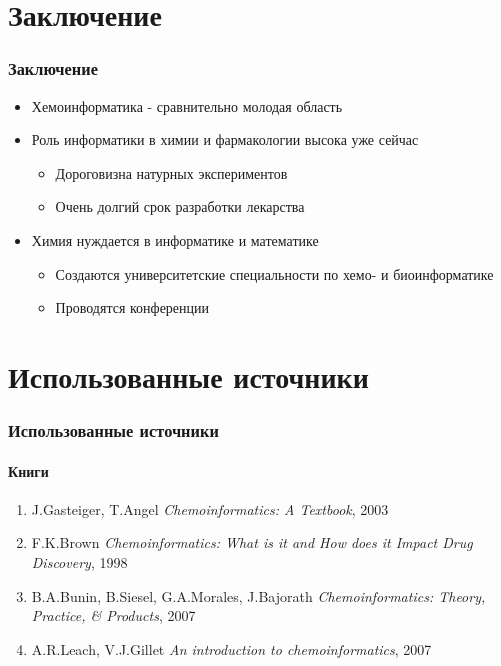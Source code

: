 \section*{Заключение}
\begin{frame}
  \frametitle{Заключение}
  \begin{itemize}
    \item Хемоинформатика - сравнительно молодая область
    \item Роль информатики в химии и фармакологии высока уже сейчас 
      \begin{itemize}
        \item Дороговизна натурных экспериментов
        \item Очень долгий срок разработки лекарства
      \end{itemize}
    \item Химия нуждается в информатике и математике
      \begin{itemize}
    \item Создаются университетские специальности по хемо- и биоинформатике
    \item Проводятся конференции
  \end{itemize}

  \end{itemize}
\end{frame}

\section*{Использованные источники}

\begin{frame}
  \frametitle{Использованные источники}
  \framesubtitle{Книги}
  \begin{enumerate}
    \item J.Gasteiger, T.Angel \emph{Chemoinformatics: A Textbook}, 2003     
    \item F.K.Brown \emph{Chemoinformatics: What is it and How does it Impact Drug Discovery}, 1998
    \item B.A.Bunin, B.Siesel, G.A.Morales, J.Bajorath \emph{Chemoinformatics: Theory, Practice, \& Products}, 2007
    \item A.R.Leach, V.J.Gillet \emph{An introduction to chemoinformatics}, 2007
  \end{enumerate}
\end{frame}

